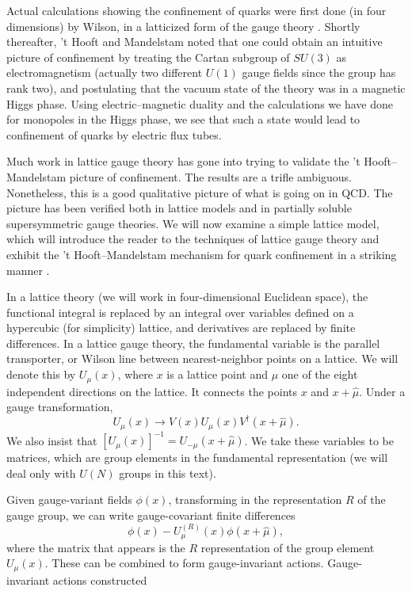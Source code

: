 Actual calculations showing the confinement of quarks were first done (in four
dimensions) by Wilson, in a latticized form of the gauge theory \cite{banks-ref-86}. Shortly
thereafter, 't Hooft \cite{banks-ref-87} and Mandelstam \cite{banks-ref-88} noted that one could obtain an
intuitive picture of confinement by treating the Cartan subgroup of $SU(3)$ as
electromagnetism (actually two different $U(1)$ gauge fields since the group has
rank two), and postulating that the vacuum state of the theory was in a magnetic
Higgs phase. Using electric--magnetic duality and the calculations we have done
for monopoles in the Higgs phase, we see that such a state would lead to
confinement of quarks by electric flux tubes.

Much work in lattice gauge theory has gone into trying to validate the
't Hooft--Mandelstam picture of confinement. The results are a trifle
ambiguous. Nonetheless, this is a good qualitative picture of what is going on
in QCD. The picture has been verified both in lattice models and in partially
soluble supersymmetric gauge theories. We will now examine a simple lattice
model, which will introduce the reader to the techniques of lattice gauge theory
and exhibit the 't Hooft--Mandelstam mechanism for quark confinement in a
striking manner \cite{banks-ref-89,banks-ref-90,banks-ref-91,banks-ref-92}.

In a lattice theory (we will work in four-dimensional Euclidean space), the
functional integral is replaced by an integral over variables defined on a
hypercubic (for simplicity) lattice, and derivatives are replaced by finite
differences. In a lattice gauge theory, the fundamental variable is the parallel transporter, or Wilson line
between nearest-neighbor points on a lattice. We will denote this by
$U_\mu(x)$, where $x$ is a lattice point and $\mu$ one of the eight independent
directions on the lattice. It connects the points $x$ and $x+\hat\mu$. Under a
gauge transformation,
\begin{equation*}
  U_\mu(x)\longrightarrow V(x)U_\mu(x)V^\dagger(x+\hat\mu).
\end{equation*}
We also insist that $[U_\mu(x)]^{-1}=U_{-\mu}(x+\hat\mu)$. We take these
variables to be matrices, which are group elements in the fundamental
representation (we will deal only with $U(N)$ groups in this text).

Given gauge-variant fields $\phi(x)$, transforming in the representation $R$ of
the gauge group, we can write gauge-covariant finite differences
\begin{equation*}
  \phi(x)-U_\mu^{(R)}(x)\phi(x+\hat\mu),
\end{equation*}
where the matrix that appears is the $R$ representation of the group element
$U_\mu(x)$. These can be combined to form gauge-invariant actions. Gauge-
invariant actions constructed

